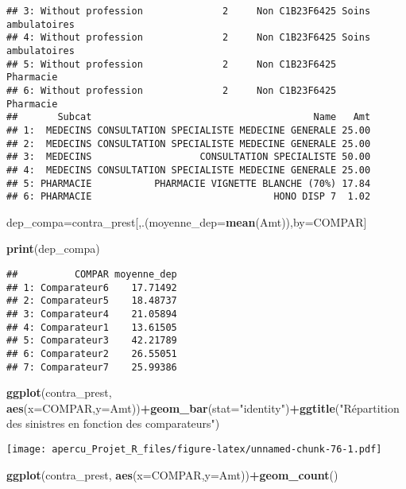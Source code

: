 \documentclass[
]{article}
\newenvironment{Shaded}{\begin{snugshade}}{\end{snugshade}}
\newcommand{\DataTypeTok}[1]{\textcolor[rgb]{0.13,0.29,0.53}{#1}}
\newcommand{\KeywordTok}[1]{\textcolor[rgb]{0.13,0.29,0.53}{\textbf{#1}}}
\newcommand{\NormalTok}[1]{#1}
\newcommand{\OperatorTok}[1]{\textcolor[rgb]{0.81,0.36,0.00}{\textbf{#1}}}
\newcommand{\StringTok}[1]{\textcolor[rgb]{0.31,0.60,0.02}{#1}}
\begin{document}
\begin{verbatim}
## 3: Without profession              2     Non C1B23F6425 Soins ambulatoires
## 4: Without profession              2     Non C1B23F6425 Soins ambulatoires
## 5: Without profession              2     Non C1B23F6425          Pharmacie
## 6: Without profession              2     Non C1B23F6425          Pharmacie
##       Subcat                                       Name   Amt
## 1:  MEDECINS CONSULTATION SPECIALISTE MEDECINE GENERALE 25.00
## 2:  MEDECINS CONSULTATION SPECIALISTE MEDECINE GENERALE 25.00
## 3:  MEDECINS                   CONSULTATION SPECIALISTE 50.00
## 4:  MEDECINS CONSULTATION SPECIALISTE MEDECINE GENERALE 25.00
## 5: PHARMACIE           PHARMACIE VIGNETTE BLANCHE (70%) 17.84
## 6: PHARMACIE                                HONO DISP 7  1.02
\end{verbatim}

\begin{Shaded}
\begin{Highlighting}[]
\NormalTok{dep_compa=contra_prest[,.(}\DataTypeTok{moyenne_dep=}\KeywordTok{mean}\NormalTok{(Amt)),by=COMPAR]}

\KeywordTok{print}\NormalTok{(dep_compa)}
\end{Highlighting}
\end{Shaded}

\begin{verbatim}
##          COMPAR moyenne_dep
## 1: Comparateur6    17.71492
## 2: Comparateur5    18.48737
## 3: Comparateur4    21.05894
## 4: Comparateur1    13.61505
## 5: Comparateur3    42.21789
## 6: Comparateur2    26.55051
## 7: Comparateur7    25.99386
\end{verbatim}

\begin{Shaded}
\begin{Highlighting}[]
\KeywordTok{ggplot}\NormalTok{(contra_prest, }\KeywordTok{aes}\NormalTok{(}\DataTypeTok{x=}\NormalTok{COMPAR,}\DataTypeTok{y=}\NormalTok{Amt))}\OperatorTok{+}\KeywordTok{geom_bar}\NormalTok{(}\DataTypeTok{stat=}\StringTok{"identity"}\NormalTok{)}\OperatorTok{+}\KeywordTok{ggtitle}\NormalTok{(}\StringTok{"Répartition des sinistres en fonction des comparateurs"}\NormalTok{)}
\end{Highlighting}
\end{Shaded}

\texttt{[image: apercu\_Projet\_R\_files/figure-latex/unnamed-chunk-76-1.pdf]}

\begin{Shaded}
\begin{Highlighting}[]
\KeywordTok{ggplot}\NormalTok{(contra_prest, }\KeywordTok{aes}\NormalTok{(}\DataTypeTok{x=}\NormalTok{COMPAR,}\DataTypeTok{y=}\NormalTok{Amt))}\OperatorTok{+}\KeywordTok{geom_count}\NormalTok{()}
\end{Highlighting}
\end{Shaded}
\end{document}
